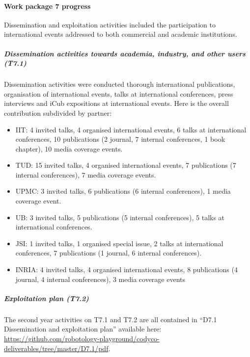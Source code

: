 

\paragraph{Work package 7 progress}

Dissemination and exploitation activities included the participation to international events addressed to both commercial and academic institutions. 

\subparagraph{Dissemination activities towards academia, industry, and other users (T7.1)}

Dissemination activities were conducted thorough international publications, organisation of international events, talks at international conferences, press interviews and iCub expositions at international events. Here is the overall contribution subdivided by partner:

\begin{itemize}

\item IIT: 4 invited talks, 4 organised international events, 6 talks at international conferences, 10 publications (2 journal, 7 internal conferences, 1 book chapter), 10 media coverage events.

\item TUD: 15 invited talks, 4 organised international events, 7 publications (7 internal conferences), 7 media coverage events.

\item UPMC: 3 invited talks, 6 publications (6 internal conferences), 1 media coverage event.

\item UB: 3 invited talks, 5 publications (5 internal conferences), 5 talks at international conferences.

\item JSI: 1 invited talks, 1 organised special issue, 2 talks at international conferences, 7 publications (1 journal, 6 internal conferences).

\item INRIA: 4 invited talks, 4 organised international events, 8 publications (4 journal, 4 internal conferences), 3 media coverage events

\end{itemize}

\subparagraph{Exploitation plan (T7.2)}

The second year activities on T7.1 and T7.2 are all contained in ``D7.1 Dissemination and exploitation plan'' available here: \url{https://github.com/robotology-playground/codyco-deliverables/tree/master/D7.1/pdf}.

